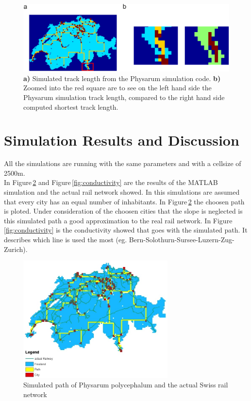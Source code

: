 \documentclass[11pt]{scrartcl}
\begin{document}
\begin{figure}[H]
	\centering
	\includegraphics[width=12cm]{figures/figure3}
	\caption{\textbf{a)} Simulated track length from the Physarum simulation code. \textbf{b)} Zoomed into the red square are to see on the left hand side the Physarum simulation track length, compared to the right hand side computed shortest track length.}
	\label{fig:short}
\end{figure}
\label{sec:matlab}


\section{Simulation Results and Discussion}
\label{sec:results}
All the simulations are running with the same parameters and with a cellsize of 2500m.
\\

In Figure\,\ref{fig:path} and Figure\,\ref{fig:conductivity} are the results of the MATLAB simulation and the actual rail network showed. In this simulations are assumed that every city has an equal number of inhabitants. In Figure\,\ref{fig:path} the choosen path is ploted. Under consideration of the choosen cities that the slope is neglected is this simulated path a good approximation to the real rail network. In Figure\,\ref{fig:conductivity} is the conductivity showed that goes with the simulated path. It describes which line is used the most (eg. Bern-Solothurn-Sursee-Luzern-Zug-Zurich).

\begin{figure}[H]
	\centering
	\includegraphics[width=0.7\textwidth]{figures/path_railway}
	\caption{Simulated path of Physarum polycephalum and the actual Swiss rail network}
	\label{fig:path}
\end{figure}
\end{document}
